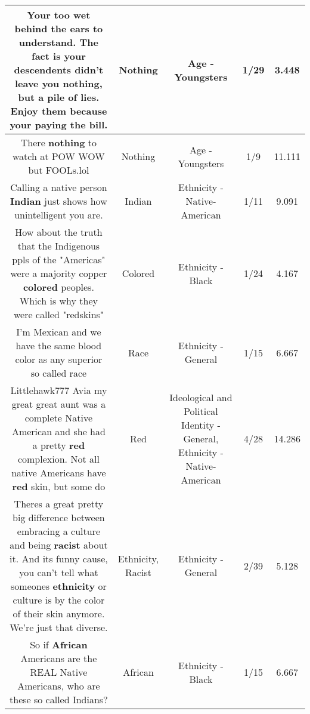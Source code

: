 \documentclass[11pt]{article}
\newlength\mylength
\begin{document}
\begin{center}
\begin{longtable}{|C{.65\mylength}|C{.30\mylength}|C{.12\mylength}|C{.12\mylength}|C{.12\mylength}|}
  \small Your too wet behind the ears to understand. The fact is your descendents didn't leave you \textbf{nothing}, but a pile of lies. Enjoy them because your paying the bill.\normalsize   & Nothing & Age - Youngsters & 1/29 & 3.448 \\  \hline
  \small There \textbf{nothing} to watch at POW WOW but FOOLs.lol\normalsize   & Nothing & Age - Youngsters & 1/9 & 11.111 \\  \hline
  \small Calling a native person \textbf{Indian} just shows how unintelligent you are.\normalsize   & Indian & Ethnicity - Native-American & 1/11 & 9.091 \\  \hline
  \small How about the truth that the Indigenous ppls of the "Americas" were a majority copper \textbf{colored} peoples. Which is why they were called "redskins"\normalsize   & Colored & Ethnicity - Black & 1/24 & 4.167 \\  \hline
  \small I'm Mexican and we have the same blood color as any superior so called race\normalsize   & Race & Ethnicity - General & 1/15 & 6.667 \\  \hline
  \small Littlehawk777 Avia my great great aunt was a complete Native American and she had a pretty \textbf{r\textbf{ed}} complexion. Not all native Americans have \textbf{r\textbf{ed}} skin, but some do\normalsize   & Red &  Ideological and Political Identity - General, Ethnicity - Native-American & 4/28 & 14.286 \\  \hline
  \small Theres a great pretty  big difference between embracing a culture and being \textbf{racist} about it. And its funny cause, you can't tell what someones \textbf{ethnicity} or culture is by the color of their skin anymore. We're just that diverse.\normalsize   & Ethnicity, Racist & Ethnicity - General & 2/39 & 5.128 \\  \hline
  \small So if \textbf{African} Americans are the REAL Native Americans, who are these so called Indians?\normalsize   & African & Ethnicity - Black & 1/15 & 6.667 \\  \hline

\end{longtable}
\end{center}
\end{document}
